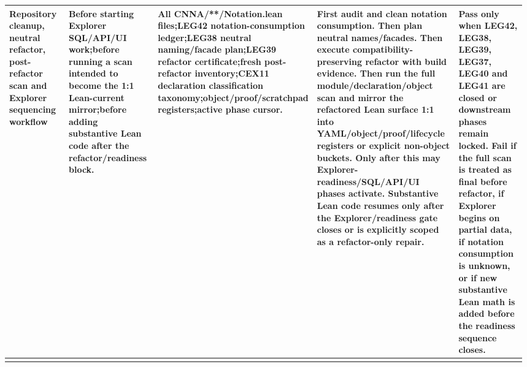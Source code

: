 \begin{longtable}{L{0.14\linewidth} L{0.19\linewidth} L{0.18\linewidth} L{0.31\linewidth} L{0.16\linewidth}}
\hline
\addlinespace[0.24em]
Repository cleanup, neutral refactor, post-refactor scan and Explorer sequencing workflow & Before starting Explorer SQL/\allowbreak{}API/\allowbreak{}UI work;\newline before running a scan intended to become the 1:1 Lean-current mirror;\newline before adding substantive Lean code after the refactor/\allowbreak{}readiness block. & All CNNA/\allowbreak{}**/\allowbreak{}Notation.lean files;\newline LEG42 notation-consumption ledger;\newline LEG38 neutral naming/\allowbreak{}facade plan;\newline LEG39 refactor certificate;\newline fresh post-refactor inventory;\newline CEX11 declaration classification taxonomy;\newline object/\allowbreak{}proof/\allowbreak{}scratchpad registers;\newline active phase cursor. & First audit and clean notation consumption. Then plan neutral names/\allowbreak{}facades. Then execute compatibility-preserving refactor with build evidence. Then run the full module/\allowbreak{}declaration/\allowbreak{}object scan and mirror the refactored Lean surface 1:1 into YAML/\allowbreak{}object/\allowbreak{}proof/\allowbreak{}lifecycle registers or explicit non-object buckets. Only after this may Explorer-readiness/\allowbreak{}SQL/\allowbreak{}API/\allowbreak{}UI phases activate. Substantive Lean code resumes only after the Explorer/\allowbreak{}readiness gate closes or is explicitly scoped as a refactor-only repair. & Pass only when LEG42, LEG38, LEG39, LEG37, LEG40 and LEG41 are closed or downstream phases remain locked. Fail if the full scan is treated as final before refactor, if Explorer begins on partial data, if notation consumption is unknown, or if new substantive Lean math is added before the readiness sequence closes.\\
\hline
\addlinespace[0.24em]

\end{longtable}
